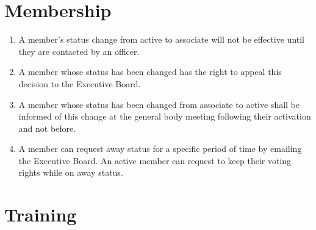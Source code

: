\documentclass[12pt,letterpaper]{book}
\begin{document}
\section{Membership}

\begin{enumerate}

\item A member's status change from active to associate will not be effective until they are contacted by an officer.
\item A member whose status has been changed has the right to appeal this decision to the Executive Board.
\item A member whose status has been changed from associate to active shall be informed of this change at the general body meeting following their activation and not before.
\item A member can request away status for a specific period of time by emailing the Executive Board.  An active member can request to keep their voting rights while on away status.

\end{enumerate}

\section{Training}
\end{document}
